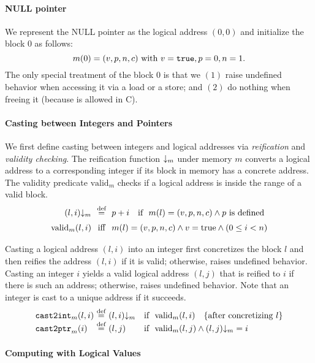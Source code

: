 \paragraph{NULL pointer} 
We represent the NULL pointer as the logical address $(0,0)$ and 
initialize the block $0$ as follows:
\[
m(0) = (v,p,n,c) \text{ with } v=\texttt{true}, p=0, n=1.
\]
The only special treatment of the block $0$ is that we $(1)$ raise
undefined behavior when accessing it via a load or a store;
and $(2)$ do nothing when freeing it (because  is allowed in C).


\paragraph{Casting between Integers and Pointers}

We first define casting between integers and logical addresses via \emph{reification} and \emph{validity checking}.
The reification function ${{}{\downarrow_{m}}}$ under memory $m$
converts a logical address to a corresponding integer if its block in memory has a concrete address.
The validity predicate $\text{valid}_m$ checks if a logical address
is inside the range of a valid block.
\[
\begin{array}{@{}r@{~~}c@{~~}ll@{}}
\toint{(l, i)}{m} &\defeq& p + i &\text{if }~ m(l) = (v, p, n, c) \land p\text{ is defined} \\[2mm]
\text{valid}_m(l,i) &\text{iff}& 
\multicolumn{2}{@{}l@{}}{
m(l) = (v, p, n, c) \land v=\mathrm{true} \land (0\le i < n)}
\\
\end{array}
\]

Casting a logical address $(l,i)$ into an integer first concretizes the
block $l$ and then reifies the address $(l,i)$ if it is valid;
otherwise, raises undefined behavior.  Casting an integer $i$ yields a
valid logical address $(l,j)$ that is reified to $i$ if there is such
an address; otherwise, raises undefined behavior. Note that 
an integer is cast to a unique address if it succeeds.
\[
\begin{array}{@{}l@{~}c@{~}ll@{}}
\code{cast2int}_m(l,i) &\defeq& \toint{(l,i)}{m} &\text{if }~ \text{valid}_m(l,i)
~~~\text{\{after concretizing $l$\}}
\\
\code{cast2ptr}_m(i)   &\defeq& (l,j) & \text{if }~ \text{valid}_m(l,j) \land \toint{(l,j)}{m}=i \\
\end{array}
\]


\paragraph{Computing with Logical Values}

